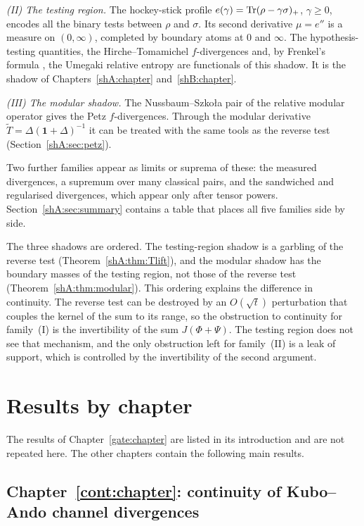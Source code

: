 \emph{(II) The testing region.} The hockey-stick profile $e(\gamma)=\operatorname{Tr}(\rho-\gamma\sigma)_+$, $\gamma\ge0$, encodes all the binary tests between $\rho$ and $\sigma$. Its second derivative $\mu=e''$ is a measure on $(0,\infty)$, completed by boundary atoms at $0$ and $\infty$. The hypothesis-testing quantities, the Hirche--Tomamichel $f$-divergences \cite{HircheTomamichel2024} and, by Frenkel's formula \cite{Frenkel2023}, the Umegaki relative entropy are functionals of this shadow. It is the shadow of Chapters~\ref{shA:chapter} and~\ref{shB:chapter}.

\emph{(III) The modular shadow.} The Nussbaum--Szko{\l}a pair of the relative modular operator \cite{NussbaumSzkola2009} gives the Petz $f$-divergences. Through the modular derivative $\widetilde T=\Delta(\mathbf 1+\Delta)^{-1}$ it can be treated with the same tools as the reverse test (Section~\ref{shA:sec:petz}).

Two further families appear as limits or suprema of these: the measured divergences, a supremum over many classical pairs, and the sandwiched and regularised divergences, which appear only after tensor powers. Section~\ref{shA:sec:summary} contains a table that places all five families side by side.

The three shadows are ordered. The testing-region shadow is a garbling of the reverse test (Theorem~\ref{shA:thm:Tlift}), and the modular shadow has the boundary masses of the testing region, not those of the reverse test (Theorem~\ref{shA:thm:modular}). This ordering explains the difference in continuity. The reverse test can be destroyed by an $O(\sqrt t)$ perturbation that couples the kernel of the sum to its range, so the obstruction to continuity for family~(I) is the invertibility of the sum $J(\Phi+\Psi)$. The testing region does not see that mechanism, and the only obstruction left for family~(II) is a leak of support, which is controlled by the invertibility of the second argument.

\section{Results by chapter}\label{ov:sec:results}

The results of Chapter~\ref{gate:chapter} are listed in its introduction and are not repeated here. The other chapters contain the following main results.

\subsection*{Chapter~\ref{cont:chapter}: continuity of Kubo--Ando channel divergences}

